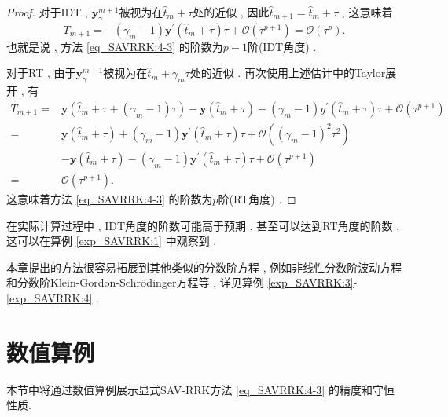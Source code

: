 \begin{proof}
对于IDT , $\bm{y}_\gamma^{m+1}$被视为在$\hat{t}_m+\tau$处的近似 , 因此$\hat{t}_{m+1}=\hat{t}_m+\tau$ , 这意味着
$$T_{m+1}=-\left(\gamma_m-1\right) \bm{y}^{\prime}\left(\hat{t}_m+\tau\right) \tau+\mathcal{O}\left(\tau^{p+1}\right)=\mathcal{O}\left(\tau^p\right) . $$
也就是说 , 方法 \eqref{eq_SAVRRK:4-3} 的阶数为$p-1$阶(IDT角度) . 

对于RT , 由于$\bm{y}_\gamma^{m+1}$被视为在$\hat{t}_m+\gamma_m \tau$处的近似 . 再次使用上述估计中的Taylor展开 , 有
\begin{align}
T_{m+1}\!= & \bm{y}\left(\hat{t}_m\!+\!\tau\!+\!\left(\gamma_m\!-\!1\right) \tau\right)\!-\!\bm{y}\left(\hat{t}_m\!+\!\tau\right)\!-\!\left(\gamma_m\!-\!1\right) y^{\prime}\left(\hat{t}_m\!+\!\tau\right) \tau\!+\!\mathcal{O}(\tau^{p+1}) \nonumber\\
\!= & \bm{y}\left(\hat{t}_m\!+\!\tau\right)\!+\!\left(\gamma_m\!-\!1\right) \bm{y}^{\prime}\left(\hat{t}_m\!+\!\tau\right) \tau\!+\!\mathcal{O}(\left(\gamma_m\!-\!1\right)^2 \tau^2)\!\nonumber\\
&-\!\bm{y}\left(\hat{t}_m\!+\!\tau\right)\!-\!\left(\gamma_m\!-\!1\right) \bm{y}^{\prime}\left(\hat{t}_m\!+\!\tau\right) \tau\!+\!\mathcal{O}(\tau^{p+1}) \nonumber\\
\!= & \mathcal{O}(\tau^{p+1}) . 
\end{align}
这意味着方法 \eqref{eq_SAVRRK:4-3} 的阶数为$p$阶(RT角度) . 

\end{proof}

\begin{remark}\label{rk_SAVRRK:5_5}
在实际计算过程中 , IDT角度的阶数可能高于预期 , 甚至可以达到RT角度的阶数 , 这可以在算例 \ref{exp_SAVRRK:1} 中观察到 . 
\end{remark}
	
\begin{remark}\label{rk_SAVRRK:5_6}
本章提出的方法很容易拓展到其他类似的分数阶方程 , 例如非线性分数阶波动方程和分数阶Klein-Gordon-Schr{\"o}dinger方程等 , 详见算例 \ref{exp_SAVRRK:3}-\ref{exp_SAVRRK:4}  . 
\end{remark}

\section{数值算例}\label{Section_SAVRRK: 6}

本节中将通过数值算例展示显式SAV-RRK方法 \eqref{eq_SAVRRK:4-3} 的精度和守恒性质.


